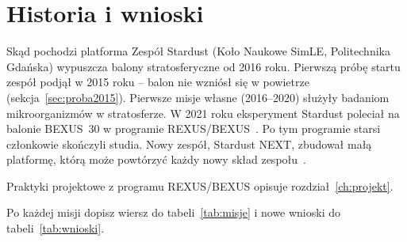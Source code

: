 \chapter{Historia i wnioski}\label{ch:historia}

\begin{sekcja}{Skąd pochodzi platforma}
Zespół Stardust (Koło Naukowe SimLE, Politechnika Gdańska) wypuszcza balony stratosferyczne od 2016 roku. Pierwszą próbę startu zespół podjął w 2015 roku -- balon nie wzniósł się w powietrze (sekcja~\ref{sec:proba2015}). Pierwsze misje własne (2016--2020) służyły badaniom mikroorganizmów w stratosferze. W 2021 roku eksperyment Stardust poleciał na balonie BEXUS~30 w programie REXUS/BEXUS~\cite{iac2023,praca2022}. Po tym programie starsi członkowie skończyli studia. Nowy zespół, Stardust NEXT, zbudował małą platformę, którą może powtórzyć każdy nowy skład zespołu~\cite{pac2024}.

Praktyki projektowe z programu REXUS/BEXUS opisuje rozdział~\ref{ch:projekt}.

Po każdej misji dopisz wiersz do tabeli~\ref{tab:misje} i nowe wnioski do tabeli~\ref{tab:wnioski}.
\end{sekcja}

